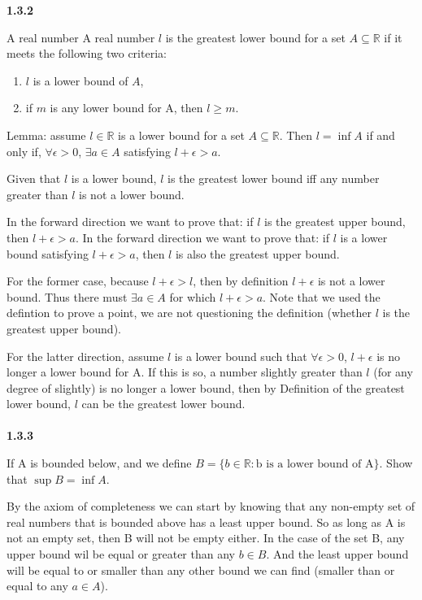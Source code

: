 \textbf{1.3.2}

A real number A real number $l$ is the greatest lower bound for a set $A \subseteq \mathbb{R}$ if it meets the following
two criteria:

\begin{enumerate}
    \item $l$ is a lower bound of $A$,
    \item if $m$ is any lower bound for A, then $l \geq m$.
\end{enumerate}

Lemma: assume $l \in \mathbb{R}$ is a lower bound for a set $A \subseteq \mathbb{R}$.
Then $l = \inf{A}$ if and only if, $\forall \epsilon > 0$, $\exists a \in A$ satisfying $l + \epsilon > a$.

Given that $l$ is a lower bound, $l$ is the greatest lower bound iff any number greater than $l$ is not a lower bound.

In the forward direction we want to prove that: if $l$ is the greatest upper bound, then $l+\epsilon > a$.
In the forward direction we want to prove that: if $l$ is a lower bound satisfying $l+\epsilon > a$, then $l$ is also the
greatest upper bound.

For the former case, because $l + \epsilon > l$, then by definition $l+\epsilon$ is not a lower bound. Thus there must
$\exists a \in A$ for which $l+\epsilon > a$.
Note that we used the defintion to prove a point, we are not questioning the definition (whether $l$ is the greatest upper bound).

For the latter direction, assume $l$ is a lower bound such that $\forall \epsilon >0$, $l+\epsilon$ is no longer a lower bound
for A.
If this is so, a number slightly greater than $l$ (for any degree of slightly) is no longer a lower bound, then by Definition
of the greatest lower bound, $l$ can be the greatest lower bound.
\\~\\


\label{abbott:1.3.3}
\textbf{1.3.3}


If A is bounded below, and we define $B = \{ b \in \mathbb{R}: \text{b is a lower bound of A} \}$.
Show that $\sup B = \inf A$.

By the axiom of completeness we can start by knowing that any non-empty set of real numbers that is bounded above
has a least upper bound.
So as long as A is not an empty set, then B will not be empty either.
In the case of the set B, any upper bound wil be equal or greater than any $b \in B$.
And the least upper bound will be equal to or smaller than any other bound we can find (smaller than or equal to
any $a \in A$).

